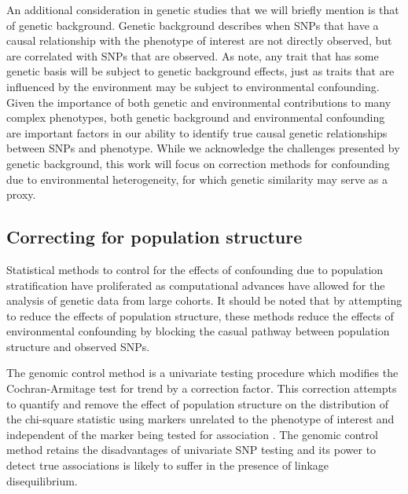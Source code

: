 An additional consideration in genetic studies that we will briefly mention is that of genetic background. Genetic background describes when SNPs that have a causal relationship with the phenotype of interest are not directly observed, but are correlated with SNPs that are observed. As \cite{vilhjalmsson2012nature} note, any trait that has some genetic basis will be subject to genetic background effects, just as traits that are influenced by the environment may be subject to environmental confounding. Given the importance of both genetic and environmental contributions to many complex phenotypes, both genetic background and environmental confounding are important factors in our ability to identify true causal genetic relationships between SNPs and phenotype. While we acknowledge the challenges presented by genetic background, this work will focus on correction methods for confounding due to environmental heterogeneity, for which genetic similarity may serve as a proxy.


\subsection{Correcting for population structure}

Statistical methods to control for the effects of confounding due to population stratification have proliferated as computational advances have allowed for the analysis of genetic data from large cohorts. It should be noted that by attempting to reduce the effects of population structure, these methods reduce the effects of environmental confounding by blocking the casual pathway between population structure and observed SNPs.

The genomic control method is a univariate testing procedure which modifies the Cochran-Armitage test for trend by a correction factor. This correction attempts to quantify and remove the effect of population structure on the distribution of the chi-square statistic using markers unrelated to the phenotype of interest and independent of the marker being tested for association \cite{devlin1999genomic, bacanu2000power, wang2009testing}. The genomic control method retains the disadvantages of univariate SNP testing and its power to detect true associations is likely to suffer in the presence of linkage disequilibrium. 

